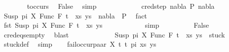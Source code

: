 \begin{isabellebody}
\ \ \ \ \ \ \isamarkupfalse%
\ t{\isacharunderscore}{\kern0pt}occurs\ \isamarkupfalse%
\ False\ \isamarkupfalse%
\ simp\isanewline
\ \ \ \ \isamarkupfalse%
\isanewline
\ \ \ \ \ \ \isamarkupfalse%
\ {\isacharparenleft}{\kern0pt}cred{\isacharunderscore}{\kern0pt}step\ nabla{}\ P{}\ nabla{}{\isacharparenright}{\kern0pt}\isanewline
\ \ \ \ \ \ \isamarkupfalse%
\ {\isachardoublequoteopen}{\isacharparenleft}{\kern0pt}{\isacharparenleft}{\kern0pt}Susp\ pi\ X{\isacharcomma}{\kern0pt}\ Func\ F\ t{\isacharparenright}{\kern0pt}\ {\isacharhash}{\kern0pt}\ xs{\isacharcomma}{\kern0pt}\ ys{\isacharparenright}{\kern0pt}\ {\isasymturnstile}\ nabla{}\ {\isasymrightarrow}\ P{}{\isachardoublequoteclose}\ \isamarkupfalse%
\ fact\isanewline
\ \ \ \ \ \ \ \isamarkupfalse%
\ \isamarkupfalse%
\ {\isachardoublequoteopen}fst\ {\isacharparenleft}{\kern0pt}{\isacharparenleft}{\kern0pt}Susp\ pi\ X{\isacharcomma}{\kern0pt}\ Func\ F\ t{\isacharparenright}{\kern0pt}\ {\isacharhash}{\kern0pt}\ xs{\isacharcomma}{\kern0pt}\ ys{\isacharparenright}{\kern0pt}\ {\isasymnoteq}\ {\isacharbrackleft}{\kern0pt}{\isacharbrackright}{\kern0pt}{\isachardoublequoteclose}\isanewline
\ \ \ \ \ \ \ \ \isamarkupfalse%
\ simp\isanewline
\ \ \ \ \ \ \isamarkupfalse%
\ \isamarkupfalse%
\ False\ \isanewline
\ \ \ \ \ \ \ \ \isamarkupfalse%
\ c{\isacharunderscore}{\kern0pt}red{\isacharunderscore}{\kern0pt}eqs{\isacharunderscore}{\kern0pt}empty\ \isamarkupfalse%
\ blast\isanewline
\ \ \ \ \isamarkupfalse%
\isanewline
\ \ \isamarkupfalse%
\isanewline
\ \ \isamarkupfalse%
\ \isamarkupfalse%
\ {\isachardoublequoteopen}{\isacharparenleft}{\kern0pt}{\isacharparenleft}{\kern0pt}Susp\ pi\ X{\isacharcomma}{\kern0pt}\ Func\ F\ t{\isacharparenright}{\kern0pt}\ {\isacharhash}{\kern0pt}\ xs{\isacharcomma}{\kern0pt}\ ys{\isacharparenright}{\kern0pt}\ {\isasymin}\ stuck{\isachardoublequoteclose}\isanewline
\ \ \ \ \isamarkupfalse%
\ stuck{\isacharunderscore}{\kern0pt}def\ \isamarkupfalse%
\ simp\isanewline
{}\isamarkupfalse%
\isanewline
\ \ \isamarkupfalse%
\ {\isacharparenleft}{\kern0pt}fail{\isacharunderscore}{\kern0pt}occur{\isacharunderscore}{\kern0pt}paar\ X\ t{}\ t{}\ pi\ xs\ ys{\isacharparenright}{\kern0pt}\isanewline

\end{isabellebody}
